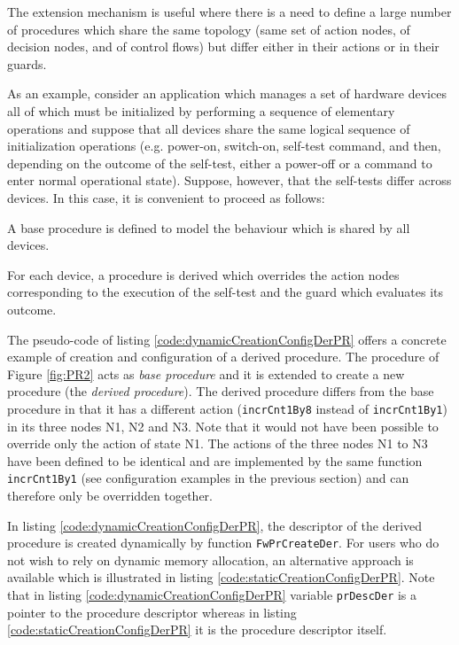 \documentclass[a4paper,10pt]{article}
\newenvironment{fw_itemize}						%
{\begin{itemize}
  \setlength{\itemsep}{1mm}
  \setlength{\parskip}{0pt}
  \setlength{\parsep}{0pt}}
{\end{itemize}}
\begin{document}
The extension mechanism is useful where there is a need to define a large number of procedures which share 
the same topology (same set of action nodes, of decision nodes, and of control flows) but differ either in their 
actions or in their guards.



As an example, consider an application which manages a set of hardware devices all of which must be
initialized by performing a sequence of elementary operations and suppose that all devices share the same
logical sequence of initialization operations (e.g. power-on, switch-on, self-test command, and then, depending
on the outcome of the self-test, either a power-off or a command to enter normal operational state). 
Suppose, however, that the self-tests differ across devices. 
In this case, it is convenient to proceed as follows:

\begin{fw_itemize}
\item A base procedure is defined to model the behaviour which is shared by all devices.
\item For each device, a procedure is derived which overrides the action nodes corresponding to the 
execution of the self-test and the guard which evaluates its outcome.
\end{fw_itemize}

The pseudo-code of listing \ref{code:dynamicCreationConfigDerPR} offers a concrete example of creation and 
configuration of a derived procedure. 
The procedure of Figure \ref{fig:PR2} acts as \emph{base procedure} and it is extended to create a new 
procedure (the \emph{derived procedure}). 
The derived procedure differs from the base procedure in that it has a different action
(\texttt{incrCnt1By8} instead of \texttt{incrCnt1By1}) in its three nodes N1, N2 and N3.
Note that it would not have been possible to override only the action of state N1. 
The actions of the three nodes N1 to N3 have been defined to be identical and are 
implemented by the same function \texttt{incrCnt1By1} (see configuration examples in the previous section) 
and can therefore only be overridden together. 

In listing \ref{code:dynamicCreationConfigDerPR}, the descriptor of the derived procedure is created dynamically by 
function \texttt{FwPrCreateDer}. For users who do not wish to rely on dynamic memory allocation, an alternative approach 
is available which is illustrated in listing \ref{code:staticCreationConfigDerPR}. 
Note that in listing \ref{code:dynamicCreationConfigDerPR} variable \texttt{prDescDer} is 
a pointer to the procedure descriptor whereas in listing \ref{code:staticCreationConfigDerPR} it is the procedure descriptor itself.
\end{document}
